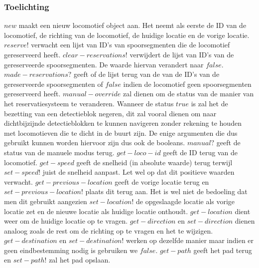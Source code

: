 \documentclass{article}
\begin{document}
\subsubsection{Toelichting}
$new$ maakt een nieuw locomotief object aan. Het neemt als eerste de ID van de locomotief, de richting van de locomotief, de huidige locatie en de vorige locatie. 
$reserve!$ verwacht een lijst van ID's van spoorsegmenten die de locomotief gereserveerd heeft. $clear-reservations!$ verwijdert de lijst van ID's van de gereserveerde
spoorsegmenten. De waarde hiervan verandert naar $false$. $made-reservations?$ geeft of de lijst terug van de van de ID's van de gereserveerde spoorsegmenten of $false$ indien de 
locomotief geen spoorsegmenten gereserveerd heeft.
$manual-override$ zal dienen om de status van de manier van het reservatiesysteem te veranderen. Wanneer de status $true$ is zal het de bezetting van een detectieblok negeren, 
dit zal vooral dienen om naar dichtbijzijnde detectieblokken te kunnen navigeren zonder rekening te houden met locomotieven die te dicht in de buurt zijn. De enige argumenten
die dus gebruikt kunnen worden hiervoor zijn dus ook de booleans. 
$manual?$ geeft de status van de manuele modus terug. $get-loco-id$ geeft de ID terug van de locomotief. $get-speed$ geeft de snelheid (in absolute waarde) terug terwijl 
$set-speed!$ juist de snelheid aanpast. Let wel op dat dit positieve waarden verwacht. $get-previous-location$ geeft de vorige locatie terug en $set-previous-location!$ plaats
dit terug aan. Het is wel niet de bedoeling dat men dit gebruikt aangezien $set-location!$ de opgeslaagde locatie als vorige locatie zet en de nieuwe locatie als huidige locatie
onthoudt. $get-location$ dient weer om de huidige locatie op te vragen. $get-direction$ en $set-direction$ dienen analoog zoals de rest om de richting op te vragen en 
het te wijzigen. $get-destination$ en $set-destination!$ werken op dezelfde manier maar indien er geen eindbestemming nodig is gebruiken we $false$. $get-path$ geeft het pad 
terug en $set-path!$ zal het pad opslaan. 
\end{document}
